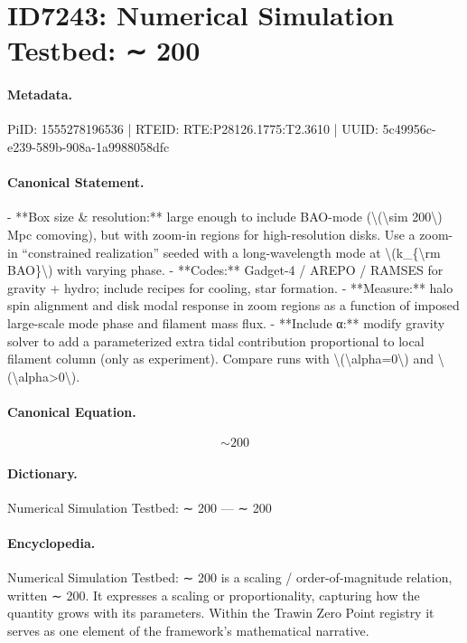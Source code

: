 \section*{ID7243: Numerical Simulation Testbed: ∼ 200}
\paragraph{Metadata.}
PiID: 1555278196536 | RTEID: RTE:P28126.1775:T2.3610 | UUID: 5c49956c-e239-589b-908a-1a9988058dfc

\paragraph{Canonical Statement.}
- **Box size \& resolution:** large enough to include BAO-mode (\textbackslash{}(\textbackslash{}sim 200\textbackslash{}) Mpc comoving), but with zoom-in regions for high-resolution disks. Use a zoom-in “constrained realization” seeded with a long-wavelength mode at \textbackslash{}(k\_\{\textbackslash{}rm BAO\}\textbackslash{}) with varying phase. - **Codes:** Gadget-4 / AREPO / RAMSES for gravity + hydro; include recipes for cooling, star formation. - **Measure:** halo spin alignment and disk modal response in zoom regions as a function of imposed large-scale mode phase and filament mass flux. - **Include α:** modify gravity solver to add a parameterized extra tidal contribution proportional to local filament column (only as experiment). Compare runs with \textbackslash{}(\textbackslash{}alpha=0\textbackslash{}) and \textbackslash{}(\textbackslash{}alpha>0\textbackslash{}).

\paragraph{Canonical Equation.}
\[
\sim 200
\]

\paragraph{Dictionary.}
Numerical Simulation Testbed: ∼ 200 — ∼ 200

\paragraph{Encyclopedia.}
Numerical Simulation Testbed: ∼ 200 is a scaling / order-of-magnitude relation, written ∼ 200. It expresses a scaling or proportionality, capturing how the quantity grows with its parameters. Within the Trawin Zero Point registry it serves as one element of the framework's mathematical narrative.
